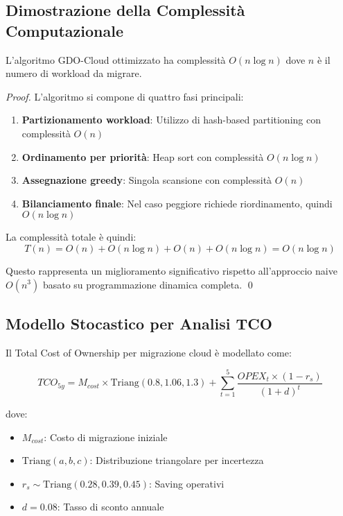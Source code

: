 \subsection{\texorpdfstring{Dimostrazione della Complessità Computazionale}{C.2.2 - Dimostrazione della Complessità Computazionale}}

\begin{theorem}
L'algoritmo GDO-Cloud ottimizzato ha complessità $O(n \log n)$ dove $n$ è il numero di workload da migrare.
\end{theorem}

\begin{proof}
L'algoritmo si compone di quattro fasi principali:
\begin{enumerate}
    \item \textbf{Partizionamento workload}: Utilizzo di hash-based partitioning con complessità $O(n)$
    \item \textbf{Ordinamento per priorità}: Heap sort con complessità $O(n \log n)$
    \item \textbf{Assegnazione greedy}: Singola scansione con complessità $O(n)$
    \item \textbf{Bilanciamento finale}: Nel caso peggiore richiede riordinamento, quindi $O(n \log n)$
\end{enumerate}

La complessità totale è quindi:
$$T(n) = O(n) + O(n \log n) + O(n) + O(n \log n) = O(n \log n)$$

Questo rappresenta un miglioramento significativo rispetto all'approccio naive $O(n^3)$ basato su programmazione dinamica completa. \qed
\end{proof}

\subsection{\texorpdfstring{Modello Stocastico per Analisi TCO}{C.2.3 - Modello Stocastico per Analisi TCO}}

Il Total Cost of Ownership per migrazione cloud è modellato come:

\begin{equation}
TCO_{5y} = M_{cost} \times \text{Triang}(0.8, 1.06, 1.3) + \sum_{t=1}^{5} \frac{OPEX_t \times (1 - r_s)}{(1 + d)^t}
\label{eq:tco}
\end{equation}

dove:
\begin{itemize}
    \item $M_{cost}$: Costo di migrazione iniziale
    \item $\text{Triang}(a,b,c)$: Distribuzione triangolare per incertezza
    \item $r_s \sim \text{Triang}(0.28, 0.39, 0.45)$: Saving operativi
    \item $d = 0.08$: Tasso di sconto annuale
\end{itemize}

